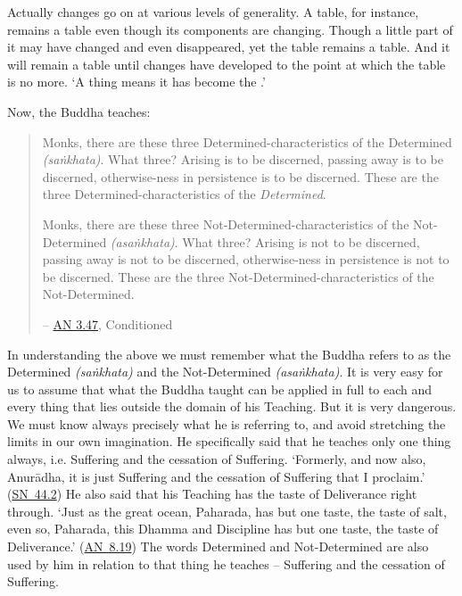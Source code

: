 Actually changes go on at various levels of generality. A table, for instance, remains a table even though its components are changing. Though a little part of it may have changed and even disappeared, yet the table remains a table. And it will remain a table until changes have developed to the point at which the table is no more. `A thing  means it has become the .'

\clearpage

Now, the Buddha teaches:

\begin{quote}
Monks, there are these three Determined-characteristics of the Determined \emph{(saṅkhata)}. What three? Arising is to be discerned, passing away is to be discerned, otherwise-ness in persistence is to be discerned. These are the three Determined-characteristics of the \emph{Determined}.

Monks, there are these three Not-Determined-characteristics of the Not-Determined \emph{(asaṅkhata)}. What three? Arising is not to be discerned, passing away is not to be discerned, otherwise-ness in persistence is not to be discerned. These are the three Not-Determined-characteristics of the Not-Determined.

 -- \href{https://suttacentral.net/an3.47/en/bodhi}{AN 3.47}, Conditioned
\end{quote}

In understanding the above we must remember what the Buddha refers to as the Determined \emph{(saṅkhata)} and the Not-Determined \emph{(asaṅkhata)}. It is very easy for us to assume that what the Buddha taught can be applied in full to each and every thing that lies outside the domain of his Teaching. But it is very dangerous. We must know always precisely what he is referring to, and avoid stretching the limits in our own imagination. He specifically said that he teaches only one thing always, i.e. Suffering and the cessation of Suffering. `Formerly, and now also, Anurādha, it is just Suffering and the cessation of Suffering that I proclaim.' (\href{https://suttacentral.net/sn44.2/en/sujato}{SN~44.2}) He also said that his Teaching has the taste of Deliverance right through. `Just as the great ocean, Paharada, has but one taste, the taste of salt, even so, Paharada, this Dhamma and Discipline has but one taste, the taste of Deliverance.' (\href{https://suttacentral.net/an8.19/en/bodhi}{AN~8.19}) The words Determined and Not-Determined are also used by him in relation to that  thing he teaches -- Suffering and the cessation of Suffering.

